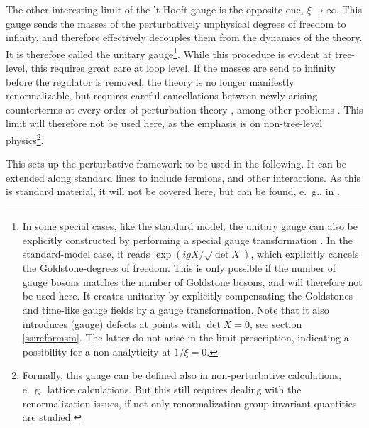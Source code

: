 \documentclass[final,twoside,12pt]{article}
\newcommand*{\1}{1\!\!\!\bot}
\begin{document}
The other interesting limit of the 't Hooft gauge is the opposite one, $\xi\to\infty$. This gauge sends the masses of the perturbatively unphysical degrees of freedom to infinity, and therefore effectively decouples them from the dynamics of the theory. It is therefore called the unitary gauge\footnote{In some special cases, like the standard model, the unitary gauge can also be explicitly constructed by performing a special gauge transformation \cite{Bohm:2001yx}. In the standard-model case, it reads $\exp(ig X/\sqrt{\det X})$, which explicitly cancels the Goldstone-degrees of freedom. This is only possible if the number of gauge bosons matches the number of Goldstone bosons, and will therefore not be used here. It creates unitarity by explicitly compensating the Goldstones and time-like gauge fields by a gauge transformation. Note that it also introduces (gauge) defects at points with $\det X=0$, see section \ref{ss:reformsm}. The latter do not arise in the limit prescription, indicating a possibility for a non-analyticity at $1/\xi=0$.}. While this procedure is evident at tree-level, this requires great care at loop level. If the masses are send to infinity before the regulator is removed, the theory is no longer manifestly renormalizable, but requires careful cancellations between newly arising counterterms at every order of perturbation theory \cite{Bohm:2001yx,Weinberg:1971fb,Lee:1973fw,Lee:1973xp,Appelquist:1972tn,Irges:2017ztc}, among other problems \cite{Bohm:2001yx,Bars:1972pe,Jackiw:1972jz}. This limit will therefore not be used here, as the emphasis is on non-tree-level physics\footnote{Formally, this gauge can be defined also in non-perturbative calculations, e.\ g.\ lattice calculations. But this still requires dealing with the renormalization issues, if not only renormalization-group-invariant quantities are studied.}.

This sets up the perturbative framework to be used in the following. It can be extended along standard lines to include fermions, and other interactions. As this is standard material, it will not be covered here, but can be found, e.\ g., in \cite{Bohm:2001yx,Barbieri:2007gi,O'Raifeartaigh:1986vq,Branco:2011iw,Langacker:1980js,Morrissey:2009tf}.
\end{document}
